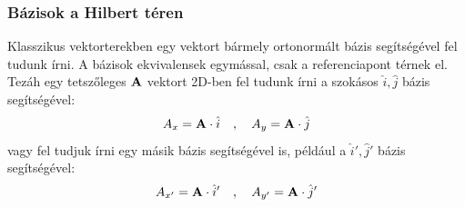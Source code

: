 \documentclass[../main.tex]{subfiles}
\begin{document}
\subsubsection{Bázisok a Hilbert téren}
Klasszikus vektorterekben egy vektort bármely ortonormált bázis segítségével fel tudunk írni. A bázisok ekvivalensek egymással, csak a referenciapont térnek el. Tezáh egy tetszőleges 
$\bold{A}$ vektort 2D-ben fel tudunk írni a szokásos $\hat{i}, \hat{j}$ bázis segítségével:
\begin{equation}
    A_x = \bold{A} \cdot \hat{i} \quad , \quad A_y = \bold{A} \cdot \hat{j}
\end{equation}
vagy fel tudjuk írni egy másik bázis segítségével is, például a $\hat{i}', \hat{j}'$ bázis segítségével:
\begin{equation}
    A_{x'} = \bold{A} \cdot \hat{i}' \quad , \quad A_{y'} = \bold{A} \cdot \hat{j}'
\end{equation}
\end{document}
